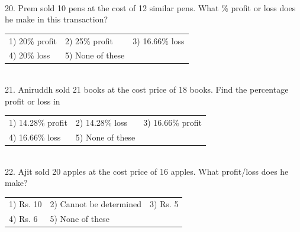 \documentclass{article}
\begin{document}
	\noindent 
	
	\noindent 
	
	\noindent 
	
	\noindent \\  20. Prem sold 10 pens at the cost of 12 similar pens. What \% profit or loss does he make in this transaction?
	
	\noindent \begin{tabular}{p{1.7in} p{1.6in} p{1.6in}} \\ 
 1) 20\% profit                                                 & 2) 25\% profit                             & 3) 16.66\% loss
	
	\noindent 
	
	\noindent \\
4) 20\% loss                                                    & 5) None of these \\
\end{tabular}
	
	\noindent 
	
	\noindent  \\ 21. Aniruddh sold 21 books at the cost price of 18 books. Find the percentage profit or loss in
	
	\noindent 
	
	\begin{tabular}{|p{1.8in}|p{1.6in}|p{1.0in}|} \hline 

	
 1) 14.28\% profit & 2) 14.28\% loss  & 3) 16.66\% profit \\
4) 16.66\% loss & 5) None of these   \\ \hline 
	\end{tabular}
	
	
	
	\noindent 
	
	\noindent 
	
	\noindent \\  22. Ajit sold 20 apples at the cost price of 16 apples. What profit/loss does he make?
	
	\noindent 
	
	\noindent \begin{tabular}{p{1.7in} p{1.6in} p{1.6in}} \\ 
 1) Rs. 10                                                            & 2) Cannot be determined        & 3) Rs. 5
	
	\noindent 
	
	\noindent \\
4) Rs. 6                                                              & 5) None of these \\
\end{tabular}
	
\end{document}
